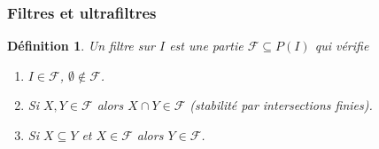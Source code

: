 \documentclass[11pt,a4paper]{article}
\newtheorem{defi}[theo]{Définition}
\newcommand{\F}{\mathcal{F}}
\newcommand{\1}{\mathbbm{1}}
\begin{document}
\subsubsection{Filtres et ultrafiltres}
\begin{defi}
Un filtre sur $I$ est une partie $\F \subseteq P(I)$ qui vérifie
\begin{enumerate}
\setlength\itemsep{-0.3em}
\item[(i)] $I \in \F$, $\emptyset \notin \F$.
\item[(ii)] Si $X,Y \in \F$ alors $X \cap Y \in \F$ (stabilité par intersections finies).
\item[(iii)] Si $X \subseteq Y$ et $X \in \F$ alors $Y \in \F$.
\end{enumerate}
\end{defi}
\end{document}
